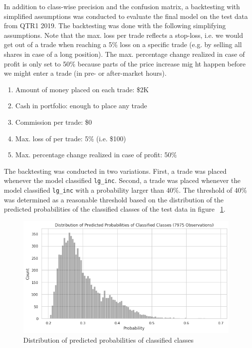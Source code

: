 \documentclass{article}
\begin{document}
	In addition to class-wise precision and the confusion matrix, a backtesting with simplified assumptions was conducted to evaluate the final model on the test data from QTR1 2019. The backtesting was done with the following simplifying assumptions. Note that the max. loss per trade reflects a stop-loss, i.e. we would get out of a trade when reaching a 5\% loss on a specific trade (e.g. by selling all shares in case of a long position). The max. percentage change realized in case of profit is only set to 50\% because parts of the price increase mig
	ht happen before we might enter a trade (in pre- or after-market hours).
	
	\begin{enumerate}
		\item 	Amount of money placed on each trade: \$2K
		\item 	Cash in portfolio: enough to place any trade
		\item 	Commission per trade: \$0
		\item 	Max. loss of per trade: 5\% (i.e. \$100)
		\item 	Max. percentage change realized in case of profit: 50\%
	\end{enumerate}
	
	The backtesting was conducted in two variations. First, a trade was placed whenever the model classified \lstinline{lg_inc}. Second, a trade was placed whenever the model classified \lstinline{lg_inc} with a probability larger than 40\%. The threshold of 40\% was determined as a reasonable threshold based on the distribution of the predicted probabilities of the classified classes of the test data in figure ~\ref{fig:dist_pred_prob}.
	
	\begin{figure}[h!]
		\includegraphics[width=\linewidth]{img/dist_pred_prob.png}
		\caption{Distribution of predicted probabilities of classified classes}
		\label{fig:dist_pred_prob}
	\end{figure}
	
\end{document}
